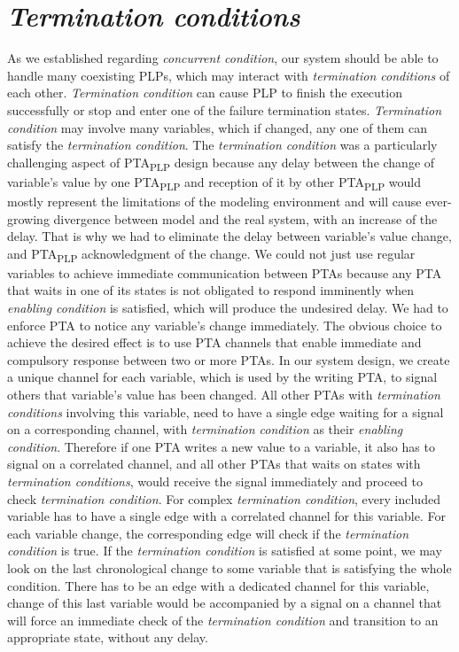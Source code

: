 \section{\textit{Termination conditions} \label{plp_to_pta_termination_conditions}}
As we established regarding \textit{concurrent condition}, our system should be able to handle many coexisting PLPs, which may interact with \textit{termination conditions} of each other. \textit{Termination condition} can cause PLP to finish the execution successfully or stop and enter one of the failure termination states. \textit{Termination condition} may involve many variables, which if changed, any one of them can satisfy the \textit{termination condition}. The \textit{termination condition} was a particularly challenging aspect of PTA\textsubscript{PLP} design because any delay between the change of variable’s value by one PTA\textsubscript{PLP} and reception of it by other PTA\textsubscript{PLP} would mostly represent the limitations of the modeling environment and will cause ever-growing divergence between model and the real system, with an increase of the delay. That is why we had to eliminate the delay between variable’s value change, and PTA\textsubscript{PLP} acknowledgment of the change. We could not just use regular variables to achieve immediate communication between PTAs because any PTA that waits in one of its states is not obligated to respond imminently when \textit{enabling condition} is satisfied, which will produce the undesired delay. We had to enforce PTA to notice any variable’s change immediately. The obvious choice to achieve the desired effect is to use PTA channels that enable immediate and compulsory response between two or more PTAs. In our system design, we create a unique channel for each variable, which is used by the writing PTA, to signal others that variable's value has been changed. All other PTAs with \textit{termination conditions} involving this variable, need to have a single edge waiting for a signal on a corresponding channel, with \textit{termination condition} as their \textit{enabling condition}. Therefore if one PTA writes a new value to a variable, it also has to signal on a correlated channel, and all other PTAs that waits on states with \textit{termination conditions}, would receive the signal immediately and proceed to check \textit{termination condition}. For complex \textit{termination condition}, every included variable has to have a single edge with a correlated channel for this variable. For each variable change, the corresponding edge will check if the \textit{termination condition} is true. If the \textit{termination condition} is satisfied at some point, we may look on the last chronological change to some variable that is satisfying the whole condition. There has to be an edge with a dedicated channel for this variable, change of this last variable would be accompanied by a signal on a channel that will force an immediate check of the \textit{termination condition} and transition to an appropriate state, without any delay.  
